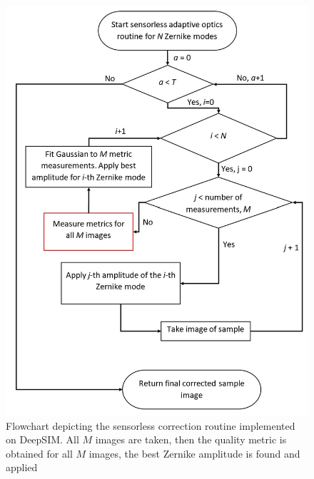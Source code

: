 \begin{figure}[h]
	\centering
	\includegraphics[scale=0.65]{./images/sensorless_correction_workflow_DeepSIM.jpg}
	\caption[Sensorless adaptive optics correction workflow]{Flowchart depicting the sensorless correction routine implemented on DeepSIM. All $M$ images are taken, then the quality metric is obtained for all $M$ images, the best Zernike amplitude is found and applied }
	\label{fig:sensorless_correction_workflow_DeepSIM}
\end{figure}

